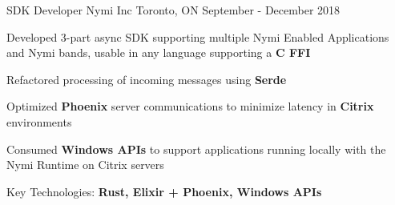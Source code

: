 \begin{cventries}
  \cventry
    {SDK Developer} %
    {Nymi Inc} %
    {Toronto, ON} %
    {September - December 2018} %
    {
      \begin{cvitems} %
        \item {Developed 3-part async SDK supporting multiple Nymi Enabled Applications and Nymi bands, usable in any language supporting a \textbf{C FFI}}
        \item {Refactored processing of incoming messages using \textbf{Serde}}
        \item {Optimized \textbf{Phoenix} server communications to minimize latency in \textbf{Citrix} environments}
        \item {Consumed \textbf{Windows APIs} to support applications running locally with the Nymi Runtime on Citrix servers}
        \item {Key Technologies: \textbf{Rust, Elixir + Phoenix, Windows APIs}}
      \end{cvitems}
    }

\end{cventries}

